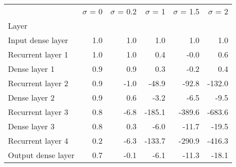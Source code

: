 \begin{tabular}{lrrrrr}
\toprule
{} &  $\sigma$  = 0 &  $\sigma$  = 0.2 &  $\sigma$  = 1 &  $\sigma$  = 1.5 &  $\sigma$  = 2 \\
Layer              &                &                  &                &                  &                \\
\midrule
Input dense layer  &            1.0 &              1.0 &            1.0 &              1.0 &            1.0 \\
Recurrent layer 1  &            1.0 &              1.0 &            0.4 &             -0.0 &            0.6 \\
Dense layer 1      &            0.9 &              0.9 &            0.3 &             -0.2 &            0.4 \\
Recurrent layer 2  &            0.9 &             -1.0 &          -48.9 &            -92.8 &         -132.0 \\
Dense layer 2      &            0.9 &              0.6 &           -3.2 &             -6.5 &           -9.5 \\
Recurrent layer 3  &            0.8 &             -6.8 &         -185.1 &           -389.6 &         -683.6 \\
Dense layer 3      &            0.8 &              0.3 &           -6.0 &            -11.7 &          -19.5 \\
Recurrent layer 4  &            0.2 &             -6.3 &         -133.7 &           -290.9 &         -416.3 \\
Output dense layer &            0.7 &             -0.1 &           -6.1 &            -11.3 &          -18.1 \\
\bottomrule
\end{tabular}
